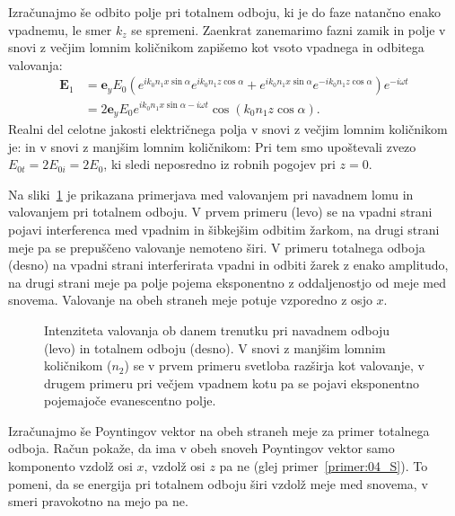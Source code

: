 Izračunajmo še odbito polje pri totalnem odboju, ki je  do faze natančno 
enako vpadnemu, le smer $k_z$ se spremeni. Zaenkrat zanemarimo fazni zamik
in polje v snovi z večjim lomnim količnikom zapišemo kot vsoto vpadnega
in odbitega valovanja:
\begin{align}
\mathbf{E}_1 &= \mathbf{e}_{y} E_{0} \left(
e^{ik_0n_1x\sin \alpha}e^{ik_0n_1z\cos \alpha}+
e^{ik_0n_1x\sin \alpha}e^{-ik_0n_1z\cos \alpha }\right) e^{-i \omega t} \nonumber\\
&= 2\mathbf{e}_{y} E_{0} e^{ik_0n_1x\sin \alpha -i\omega t} 
\cos \left(k_0 n_1z\cos \alpha \right).
 \label{eq:04_65}
\end{align}
Realni del celotne jakosti električnega polja v snovi z večjim lomnim 
količnikom je:
in v snovi z manjšim lomnim količnikom:
Pri tem smo upoštevali zvezo $E_{0t} = 2E_{0i} = 2E_0$, ki sledi neposredno iz 
robnih pogojev pri $z=0$.

Na sliki~\ref{fig:04_simulacija} je prikazana primerjava med valovanjem
pri navadnem lomu in valovanjem pri totalnem odboju. V prvem primeru (levo) se
na vpadni strani pojavi interferenca med
vpadnim in šibkejšim odbitim žarkom, na drugi strani meje pa se prepuščeno valovanje nemoteno
širi. V primeru totalnega odboja (desno) na vpadni strani interferirata 
vpadni in odbiti žarek z enako amplitudo, na drugi strani meje pa polje pojema 
eksponentno z oddaljenostjo od meje med snovema. Valovanje na obeh straneh meje
potuje vzporedno z osjo $x$. 
\begin{figure}[ht]
\centering
\def\svgwidth{140truemm} 

\caption{Intenziteta valovanja ob 
danem trenutku pri navadnem odboju (levo) in totalnem odboju (desno).
V snovi z manjšim lomnim količnikom ($n_2$) se v prvem primeru svetloba razširja
kot valovanje, v drugem primeru pri večjem vpadnem kotu pa se pojavi eksponentno pojemajoče evanescentno
polje.}
\label{fig:04_simulacija}
\end{figure}

Izračunajmo še Poyntingov vektor na obeh straneh meje za primer totalnega odboja. 
Račun pokaže, da ima v obeh snoveh Poyntingov vektor samo komponento vzdolž osi $x$,
vzdolž osi $z$ pa ne (glej primer~\ref{primer:04_S}). To pomeni, da se energija pri totalnem odboju širi 
vzdolž meje med snovema, v smeri pravokotno na mejo pa ne.  

